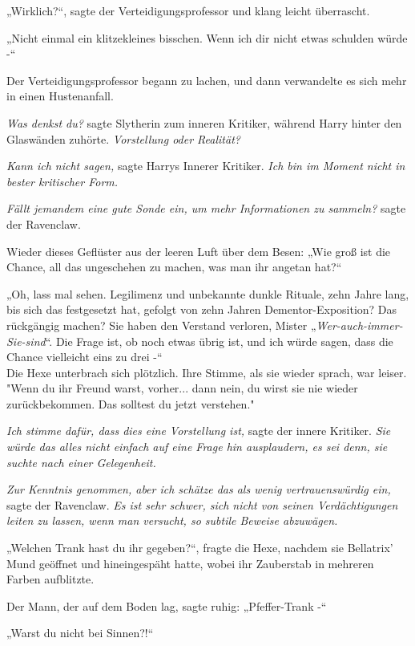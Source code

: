 {„Wirklich?“, sagte der Verteidigungsprofessor und klang leicht überrascht.

„Nicht einmal ein klitzekleines bisschen. Wenn ich dir nicht etwas schulden würde -“

Der Verteidigungsprofessor begann zu lachen, und dann verwandelte es sich mehr in einen Hustenanfall.

\emph{Was denkst du?} sagte Slytherin zum inneren Kritiker, während Harry hinter den Glaswänden zuhörte. \emph{Vorstellung oder Realität?}

\emph{Kann ich nicht sagen,} sagte Harrys Innerer Kritiker. \emph{Ich bin im Moment nicht in bester kritischer Form.}

\emph{Fällt jemandem eine gute Sonde ein, um mehr Informationen zu sammeln?} sagte der Ravenclaw.

Wieder dieses Geflüster aus der leeren Luft über dem Besen: „Wie groß ist die Chance, all das ungeschehen zu machen, was man ihr angetan hat?“

„Oh, lass mal sehen. Legilimenz und unbekannte dunkle Rituale, zehn Jahre lang, bis sich das festgesetzt hat, gefolgt von zehn Jahren Dementor-Exposition? Das rückgängig machen? Sie haben den Verstand verloren, Mister „\emph{Wer-auch-immer-Sie-sind}“. Die Frage ist, ob noch etwas übrig ist, und ich würde sagen, dass die Chance vielleicht eins zu drei -“\\ Die Hexe unterbrach sich plötzlich. Ihre Stimme, als sie wieder sprach, war leiser.\\ "Wenn du ihr Freund warst, vorher... dann nein, du wirst sie nie wieder zurückbekommen. Das solltest du jetzt verstehen."

\emph{Ich stimme dafür, dass dies eine Vorstellung ist,} sagte der innere Kritiker. \emph{Sie würde das alles nicht einfach auf eine Frage hin ausplaudern, es sei denn, sie suchte nach einer Gelegenheit.}

\emph{Zur Kenntnis genommen, aber ich schätze das als wenig vertrauenswürdig ein,} sagte der Ravenclaw. \emph{Es ist sehr schwer, sich nicht von seinen Verdächtigungen leiten zu lassen, wenn man versucht, so subtile Beweise abzuwägen.}

„Welchen Trank hast du ihr gegeben?“, fragte die Hexe, nachdem sie Bellatrix' Mund geöffnet und hineingespäht hatte, wobei ihr Zauberstab in mehreren Farben aufblitzte.

Der Mann, der auf dem Boden lag, sagte ruhig: „Pfeffer-Trank -“

„Warst du nicht bei Sinnen?!“

}
